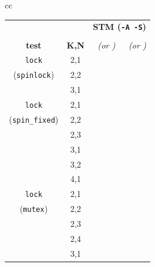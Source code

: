 \begin{table}[t]
	\begin{center}
		\footnotesize
		\begin{tabular}{cc}
		\begin{tabular}{cc||r|r}
			& & \multicolumn{2}{c}{\bf STM ({\tt -A -S})} \\
			& & \cpu{\bf cpu (s)} & \ints{\bf SS size} \\
			\bf test & \bf K,N  & \em (or \ETAdag{\bf \em est.})
			                      & \em (or \ETAdag{\bf \em est.}) \\
			\hline
			\hline
			{\tt lock}
			& 2,1 & \cpu{3.41} & \ints{4} \\
			({\tt spinlock})
			& 2,2 & \cpu{198.77} & \ints{1702} \\
			& 3,1 & \cpu{35.28} & \ints{246} \\
			\hline
			{\tt lock}
			& 2,1 & \cpu{3.55} & \ints{4} \\
			({\tt spin\_fixed})
			& 2,2 & \cpu{105.57} & \ints{998} \\
			& 2,3 & \ETAdag{33h 13m} & \ETAdag{321553} \\
			& 3,1 & \cpu{28.27} & \ints{186} \\
			& 3,2 & \ETAdag{13y 281d} & \ETAdag{1443676} \\
			& 4,1 & \ETAdag{16h 26m} & \ETAdag{432628} \\ %
			\hline
			{\tt lock}
			& 2,1 & \cpu{3.44} & \ints{4}		\\
			({\tt mutex})
			& 2,2 & \cpu{16.83} & \ints{180}	\\
			& 2,3 & \cpu{405.21} & \ints{9372}	\\
			& 2,4 & \cpu{24999.68} & \ints{489480}	\\ %
			& 3,1 & \cpu{15.00} & \ints{132}	\\

\end{tabular}
\end{tabular}
\end{center}
\end{table}
